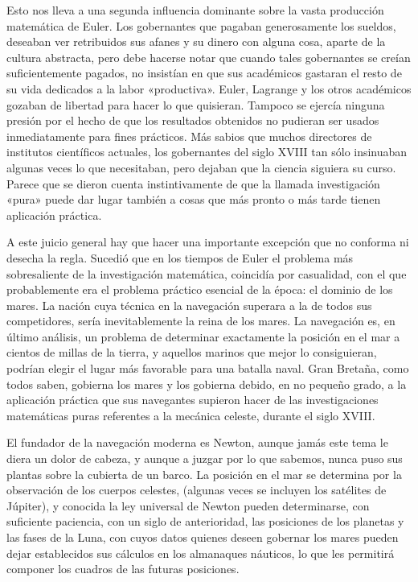 \documentclass[a4paper, 12pt]{article}
\begin{document}
Esto nos lleva a una segunda influencia dominante sobre la vasta producción matemática de Euler. Los gobernantes que pagaban generosamente los sueldos, deseaban ver retribuidos sus afanes y su dinero con alguna cosa, aparte de la cultura abstracta, pero debe hacerse notar que cuando tales gobernantes se creían suficientemente pagados, no insistían en que sus académicos gastaran el resto de su vida dedicados a la labor «productiva». Euler, Lagrange y los otros académicos gozaban de libertad para hacer lo que quisieran. Tampoco se ejercía ninguna presión por el hecho de que los resultados obtenidos no pudieran ser usados inmediatamente para fines prácticos. Más sabios que muchos directores de institutos científicos actuales, los gobernantes del siglo XVIII tan sólo insinuaban algunas veces lo que necesitaban, pero dejaban que la ciencia siguiera su curso. Parece que se dieron cuenta instintivamente de que la llamada investigación «pura» puede dar lugar también a cosas que más pronto o más tarde tienen aplicación práctica.

A este juicio general hay que hacer una importante excepción que no conforma ni desecha la regla. Sucedió que en los tiempos de Euler el problema más sobresaliente de la investigación matemática, coincidía por casualidad, con el que probablemente era el problema práctico esencial de la época: el dominio de los mares. La nación cuya técnica en la navegación superara a la de todos sus competidores, sería inevitablemente la reina de los mares. La navegación es, en último análisis, un problema de determinar exactamente la posición en el mar a cientos de millas de la tierra, y aquellos marinos que mejor lo consiguieran, podrían elegir el lugar más favorable para una batalla naval. Gran Bretaña, como todos saben, gobierna los mares y los gobierna debido, en no pequeño grado, a la aplicación práctica que sus navegantes supieron hacer de las investigaciones matemáticas puras referentes a la mecánica celeste, durante el siglo XVIII.

El fundador de la navegación moderna es Newton, aunque jamás este tema le diera un dolor de cabeza, y aunque a juzgar por lo que sabemos, nunca puso sus plantas sobre la cubierta de un barco. La posición en el mar se determina por la observación de los cuerpos celestes, (algunas veces se incluyen los satélites de Júpiter), y conocida la ley universal de Newton pueden determinarse, con suficiente paciencia, con un siglo de anterioridad, las posiciones de los planetas y las fases de la Luna, con cuyos datos quienes deseen gobernar los mares pueden dejar establecidos sus cálculos en los almanaques náuticos, lo que les permitirá componer los cuadros de las futuras posiciones.
\end{document}
